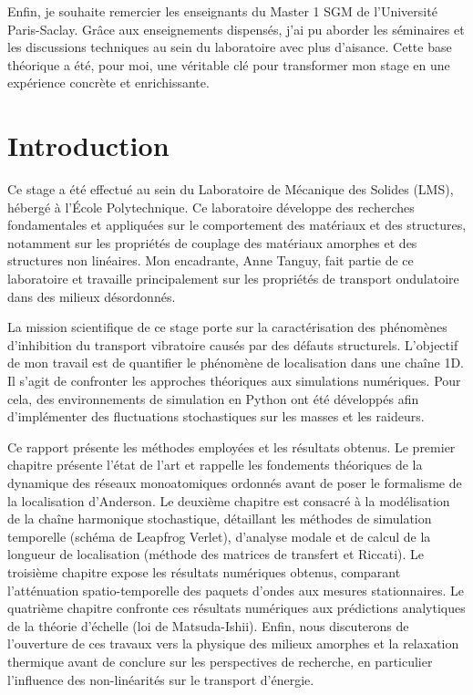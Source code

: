 \documentclass[11pt, a4paper, twoside]{article}
\begin{document}
Enfin, je souhaite remercier les enseignants du Master 1 SGM de l'Université Paris-Saclay. Grâce aux enseignements dispensés, j'ai pu aborder les séminaires et les discussions techniques au sein du laboratoire avec plus d'aisance. Cette base théorique a été, pour moi, une véritable clé pour transformer mon stage en une expérience concrète et enrichissante.

\newpage

\tableofcontents

\newpage

\section*{Introduction} 

Ce stage a été effectué au sein du Laboratoire de Mécanique des Solides (LMS), hébergé à l'École Polytechnique. Ce laboratoire développe des recherches fondamentales et appliquées sur le comportement des matériaux et des structures, notamment sur les propriétés de couplage des matériaux amorphes et des structures non linéaires. Mon encadrante, Anne Tanguy, fait partie de ce laboratoire et travaille principalement sur les propriétés de transport ondulatoire dans des milieux désordonnés.

La mission scientifique de ce stage porte sur la caractérisation des phénomènes d'inhibition du transport vibratoire causés par des défauts structurels. L'objectif de mon travail est de quantifier le phénomène de localisation dans une chaîne 1D. Il s'agit de confronter les approches théoriques aux simulations numériques. Pour cela, des environnements de simulation en Python ont été développés afin d'implémenter des fluctuations stochastiques sur les masses et les raideurs. 

Ce rapport présente les méthodes employées et les résultats obtenus. Le premier chapitre présente l'état de l'art et rappelle les fondements théoriques de la dynamique des réseaux monoatomiques ordonnés avant de poser le formalisme de la localisation d'Anderson. Le deuxième chapitre est consacré à la modélisation de la chaîne harmonique stochastique, détaillant les méthodes de simulation temporelle (schéma de Leapfrog Verlet), d'analyse modale et de calcul de la longueur de localisation (méthode des matrices de transfert et Riccati). Le troisième chapitre expose les résultats numériques obtenus, comparant l'atténuation spatio-temporelle des paquets d'ondes aux mesures stationnaires. Le quatrième chapitre confronte ces résultats numériques aux prédictions analytiques de la théorie d'échelle (loi de Matsuda-Ishii). Enfin, nous discuterons de l'ouverture de ces travaux vers la physique des milieux amorphes et la relaxation thermique avant de conclure sur les perspectives de recherche, en particulier l'influence des non-linéarités sur le transport d'énergie.
\end{document}
